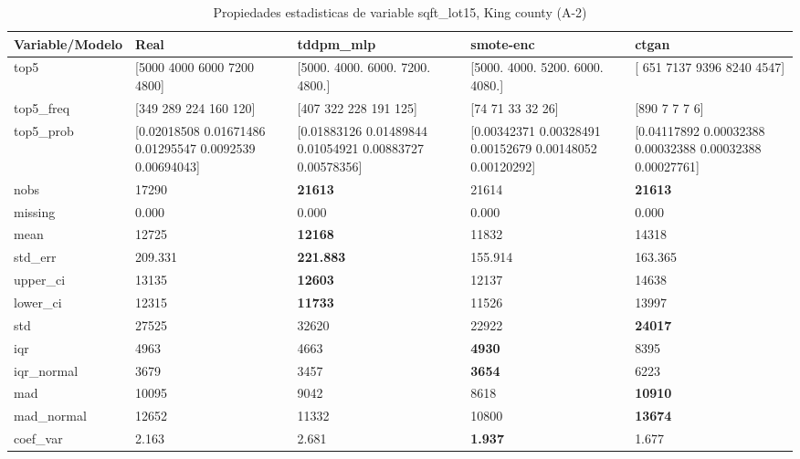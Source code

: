 \begin{table}[H]
\centering
\fontsize{8}{14}\selectfont
\caption{Propiedades  estadisticas de variable sqft\_lot15, King county (A-2)}
\label{table-stats-king county-a-2-sqft_lot15}
\begin{tabular}{|l|m{10em}|m{10em}|m{10em}|m{10em}|}
\hline
 \rowcolor[gray]{0.8}
Variable/Modelo & Real & tddpm\_mlp & smote-enc & ctgan \\
\hline top5 & [5000 4000 6000 7200 4800] & [5000. 4000. 6000. 7200. 4800.] & [5000. 4000. 5200. 6000. 4080.] & [ 651 7137 9396 8240 4547] \\
\hline top5\_freq & [349 289 224 160 120] & [407 322 228 191 125] & [74 71 33 32 26] & [890   7   7   7   6] \\
\hline top5\_prob & [0.02018508 0.01671486 0.01295547 0.0092539  0.00694043] & [0.01883126 0.01489844 0.01054921 0.00883727 0.00578356] & [0.00342371 0.00328491 0.00152679 0.00148052 0.00120292] & [0.04117892 0.00032388 0.00032388 0.00032388 0.00027761] \\
\hline nobs & 17290 & \bfseries 21613 & \cellcolor[rgb]{0.9, 0.54, 0.52} 21614 & \bfseries 21613 \\
\hline missing & 0.000 & 0.000 & 0.000 & 0.000 \\
\hline mean & 12725 & \bfseries 12168 & 11832 & \cellcolor[rgb]{0.9, 0.54, 0.52} 14318 \\
\hline std\_err & 209.331 & \bfseries 221.883 & \cellcolor[rgb]{0.9, 0.54, 0.52} 155.914 & 163.365 \\
\hline upper\_ci & 13135 & \bfseries 12603 & 12137 & \cellcolor[rgb]{0.9, 0.54, 0.52} 14638 \\
\hline lower\_ci & 12315 & \bfseries 11733 & 11526 & \cellcolor[rgb]{0.9, 0.54, 0.52} 13997 \\
\hline std & 27525 & \cellcolor[rgb]{0.9, 0.54, 0.52} 32620 & 22922 & \bfseries 24017 \\
\hline iqr & 4963 & 4663 & \bfseries 4930 & \cellcolor[rgb]{0.9, 0.54, 0.52} 8395 \\
\hline iqr\_normal & 3679 & 3457 & \bfseries 3654 & \cellcolor[rgb]{0.9, 0.54, 0.52} 6223 \\
\hline mad & 10095 & 9042 & \cellcolor[rgb]{0.9, 0.54, 0.52} 8618 & \bfseries 10910 \\
\hline mad\_normal & 12652 & 11332 & \cellcolor[rgb]{0.9, 0.54, 0.52} 10800 & \bfseries 13674 \\
\hline coef\_var & 2.163 & \cellcolor[rgb]{0.9, 0.54, 0.52} 2.681 & \bfseries 1.937 & 1.677 \\

\end{tabular}
\end{table}
